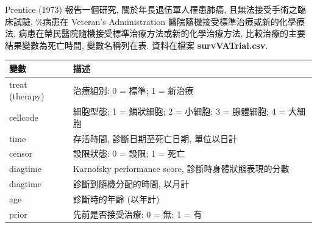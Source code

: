 \documentclass[
]{book}
\begin{document}
Prentice (1973) 報告一個研究,
關於年長退伍軍人罹患肺癌, 且無法接受手術之臨床試驗,
\%病患在 Veteran's Administration 醫院隨機接受標準治療或新的化學療法,
病患在榮民醫院隨機接受標準治療方法或新的化學治療方法,
比較治療的主要結果變數為死亡時間,
變數名稱列在表.
資料在檔案 \textbf{survVATrial.csv}.

\begin{longtable}[]{@{}ll@{}}
\toprule
變數 & 描述\tabularnewline
\midrule
\endhead
treat (therapy) & 治療組別: 0 = 標準; 1 = 新治療\tabularnewline
cellcode & 細胞型態; 1 = 鱗狀細胞; 2 = 小細胞; 3 = 腺體細胞; 4 = 大細胞\tabularnewline
time & 存活時間, 診斷日期至死亡日期, 單位以日計\tabularnewline
censor & 設限狀態: 0 = 設限; 1 = 死亡\tabularnewline
diagtime & Karnofsky performance score, 診斷時身體狀態表現的分數\tabularnewline
diagtime & 診斷到隨機分配的時間, 以月計\tabularnewline
age & 診斷時的年齡 (以年計)\tabularnewline
prior & 先前是否接受治療; 0 = 無; 1 = 有\tabularnewline
\bottomrule
\end{longtable}
\end{document}

